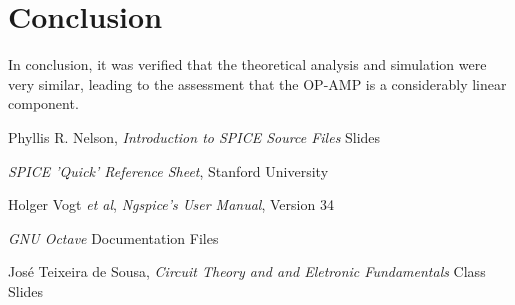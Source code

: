 \clearpage
\section{Conclusion}
\label{sec:conclusion}

In conclusion, it was verified that the theoretical analysis and simulation were very similar, leading to the assessment that the OP-AMP is a considerably linear component.

\begin{thebibliography}{}

Phyllis R. Nelson, \emph{Introduction to SPICE Source Files} Slides

\emph{SPICE 'Quick' Reference Sheet}, Stanford University

Holger Vogt \textit{et al}, \emph{Ngspice's User Manual}, Version 34

\emph{GNU Octave} Documentation Files 

José Teixeira de Sousa, \emph{Circuit Theory and and Eletronic Fundamentals} Class Slides

\end{thebibliography}